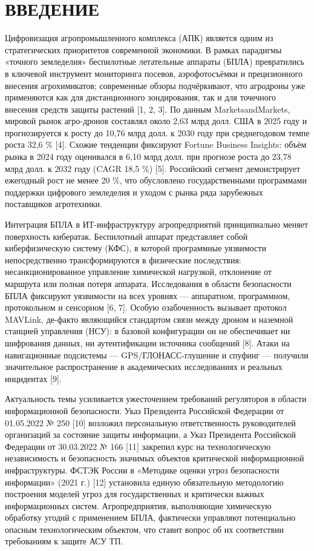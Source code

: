 \documentclass[14pt,a4paper]{extarticle}
\begin{document}
\tableofcontents
\clearpage

\hypertarget{ux432ux432ux435ux434ux435ux43dux438ux435}{%
\section{ВВЕДЕНИЕ}\label{ux432ux432ux435ux434ux435ux43dux438ux435}}

Цифровизация агропромышленного комплекса (АПК) является одним из стратегических приоритетов современной экономики. В рамках парадигмы «точного земледелия» беспилотные летательные аппараты (БПЛА) превратились в ключевой инструмент мониторинга посевов, аэрофотосъёмки и прецизионного внесения агрохимикатов; современные обзоры подчёркивают, что агродроны уже применяются как для дистанционного зондирования, так и для точечного внесения средств защиты растений {[}1, 2, 3{]}. По данным MarketsandMarkets, мировой рынок агро-дронов составлял около 2,63 млрд долл. США в 2025 году и прогнозируется к росту до 10,76 млрд долл. к 2030 году при среднегодовом темпе роста 32,6 \% {[}4{]}. Схожие тенденции фиксируют Fortune Business Insights: объём рынка в 2024 году оценивался в 6,10 млрд долл. при прогнозе роста до 23,78 млрд долл. к 2032 году (CAGR 18,5 \%) {[}5{]}. Российский сегмент демонстрирует ежегодный рост не менее 20 \%, что обусловлено государственными программами поддержки цифрового земледелия и уходом с рынка ряда зарубежных поставщиков агротехники.

Интеграция БПЛА в ИТ-инфраструктуру агропредприятий принципиально меняет поверхность кибератак. Беспилотный аппарат представляет собой киберфизическую систему (КФС), в которой программные уязвимости непосредственно трансформируются в физические последствия: несанкционированное управление химической нагрузкой, отклонение от маршрута или полная потеря аппарата. Исследования в области безопасности БПЛА фиксируют уязвимости на всех уровнях --- аппаратном, программном, протокольном и сенсорном {[}6, 7{]}. Особую озабоченность вызывает протокол MAVLink, де-факто являющийся стандартом связи между дроном и наземной станцией управления (НСУ): в базовой конфигурации он не обеспечивает ни шифрования данных, ни аутентификации источника сообщений {[}8{]}. Атаки на навигационные подсистемы --- GPS/ГЛОНАСС-глушение и спуфинг --- получили значительное распространение в академических исследованиях и реальных инцидентах {[}9{]}.

Актуальность темы усиливается ужесточением требований регуляторов в области информационной безопасности. Указ Президента Российской Федерации от 01.05.2022 № 250 {[}10{]} возложил персональную ответственность руководителей организаций за состояние защиты информации, а Указ Президента Российской Федерации от 30.03.2022 № 166 {[}11{]} закрепил курс на технологическую независимость и безопасность значимых объектов критической информационной инфраструктуры. ФСТЭК России в «Методике оценки угроз безопасности информации» (2021 г.) {[}12{]} установила единую обязательную методологию построения моделей угроз для государственных и критически важных информационных систем. Агропредприятия, выполняющие химическую обработку угодий с применением БПЛА, фактически управляют потенциально опасным технологическим объектом, что ставит вопрос об их соответствии требованиям к защите АСУ ТП.
\end{document}
